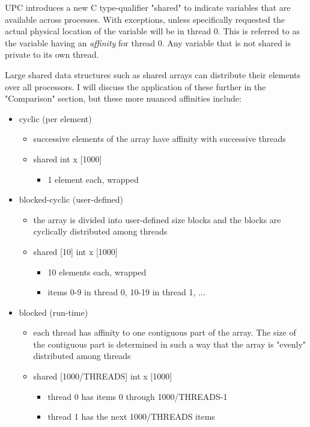 \documentclass{article}
\begin{document}
UPC introduces a new C type-qualifier "shared" to indicate variables that are available across processes. With exceptions, unless specifically requested the actual physical location of the variable will be in thread 0. This is referred to as the variable having an \emph{affinity} for thread 0. Any variable that is not shared is private to its own thread. 

Large shared data structures such as shared arrays can distribute their elements over all processors. I will discuss the application of these further in the "Comparison" section, but these more nuanced affinities include:
\begin{itemize}
    \item cyclic (per element)
    \begin{itemize}
        \item successive elements of the array have affinity with successive threads
        \item shared int x [1000]
        \begin{itemize}
            \item 1 element each, wrapped
        \end{itemize}
    \end{itemize}
    \item blocked-cyclic  (user-defined)
    \begin{itemize}
        \item the array is divided into user-defined size blocks and the blocks are cyclically distributed among threads
        \item shared [10] int x [1000]
        \begin{itemize}
            \item 10 elements each, wrapped
            \item items 0-9 in thread 0, 10-19 in thread 1, ...
        \end{itemize}
    \end{itemize}
    \item blocked  (run-time)
    \begin{itemize}
        \item each thread has affinity to one contiguous part of the array. The size of the contiguous part is determined in such a way that the array is "evenly" distributed among threads
        \item shared [1000/THREADS] int x [1000]
        \begin{itemize}
            \item thread 0 has items 0 through 1000/THREADS-1
            \item thread 1 has the next 1000/THREADS items
        \end{itemize}
    \end{itemize}
\end{itemize}
\end{document}
